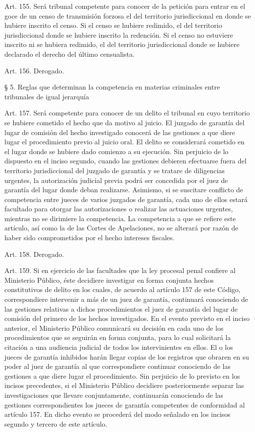     Art. 155. Será tribunal competente para conocer de la petición para entrar en el goce de un censo de transmisión forzosa el del territorio jurisdiccional en donde se hubiere inscrito el censo. Si el censo se hubiere redimido, el del territorio jurisdiccional donde se hubiere inscrito la redención. Si el censo no estuviere inscrito ni se hubiera redimido, el del territorio jurisdiccional donde se hubiere declarado el derecho del último censualista.

    Art. 156. Derogado.

    § 5. Reglas que determinan la competencia en materias criminales entre tribunales de igual jerarquía


    Art. 157. Será competente para conocer de un delito el tribunal en cuyo territorio se hubiere cometido el hecho que da motivo al juicio.
    El juzgado de garantía del lugar de comisión del hecho investigado conocerá de las gestiones a que diere lugar el procedimiento previo al juicio oral.
    El delito se considerará cometido en el lugar donde se hubiere dado comienzo a su ejecución.
    Sin perjuicio de lo dispuesto en el inciso segundo, cuando las gestiones debieren efectuarse fuera del territorio jurisdiccional del juzgado de garantía y se tratare de diligencias urgentes, la autorización judicial previa podrá ser concedida por el juez de garantía del lugar donde deban realizarse. Asimismo, si se suscitare conflicto de competencia entre jueces de varios juzgados de garantía, cada uno de ellos estará facultado para otorgar las autorizaciones o realizar las actuaciones urgentes, mientras no se dirimiere la competencia.
    La competencia a que se refiere este artículo, así como la de las Cortes de Apelaciones, no se alterará por razón de haber sido comprometidos por el hecho intereses fiscales.


    Art. 158. Derogado.



    Art. 159. Si en ejercicio de las facultades que la ley procesal penal confiere al Ministerio Público, éste decidiere investigar en forma conjunta hechos constitutivos de delito en los cuales, de acuerdo al artículo 157 de este Código, correspondiere intervenir a más de un juez de garantía, continuará conociendo de las gestiones relativas a dichos procedimientos el juez de garantía del lugar de comisión del primero de los hechos investigados.
    En el evento previsto en el inciso anterior, el Ministerio Público comunicará su decisión en cada uno de los procedimientos que se seguirán en forma conjunta, para lo cual solicitará la citación a una audiencia judicial de todos los intervinientes en ellos.
    El o los jueces de garantía inhibidos harán llegar copias de los registros que obraren en su poder al juez de garantía al que correspondiere continuar conociendo de las gestiones a que diere lugar el procedimiento.
    Sin perjuicio de lo previsto en los incisos precedentes, si el Ministerio Público decidiere posteriormente separar las investigaciones que llevare conjuntamente, continuarán conociendo de las gestiones correspondientes los jueces de garantía competentes de conformidad al artículo 157. En dicho evento se procederá del modo señalado en los incisos segundo y tercero de este artículo.



